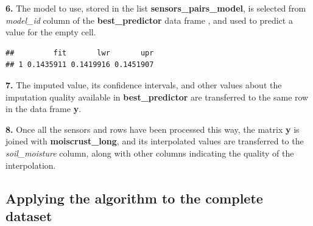 \documentclass[]{article}
\newenvironment{Shaded}{\begin{snugshade}}{\end{snugshade}}
\newcommand{\DataTypeTok}[1]{\textcolor[rgb]{0.13,0.29,0.53}{#1}}
\newcommand{\KeywordTok}[1]{\textcolor[rgb]{0.13,0.29,0.53}{\textbf{#1}}}
\newcommand{\NormalTok}[1]{#1}
\newcommand{\OperatorTok}[1]{\textcolor[rgb]{0.81,0.36,0.00}{\textbf{#1}}}
\newcommand{\OtherTok}[1]{\textcolor[rgb]{0.56,0.35,0.01}{#1}}
\newcommand{\StringTok}[1]{\textcolor[rgb]{0.31,0.60,0.02}{#1}}
\begin{document}
\begin{table}[H]
\centering
{}
\end{table}

\textbf{6.} The model to use, stored in the list
\textbf{sensors\_pairs\_model}, is selected from \emph{model\_id} column
of the \textbf{best\_predictor} data frame , and used to predict a value
for the empty cell.

\begin{Shaded}
\end{Shaded}

\begin{verbatim}
##         fit       lwr       upr
## 1 0.1435911 0.1419916 0.1451907
\end{verbatim}

\textbf{7.} The imputed value, its confidence intervals, and other
values about the imputation quality available in
\textbf{best\_predictor} are transferred to the same row in the data
frame \textbf{y}.

\textbf{8.} Once all the sensors and rows have been processed this way,
the matrix \textbf{y} is joined with \textbf{moiscrust\_long}, and its
interpolated values are transferred to the \emph{soil\_moisture} column,
along with other columns indicating the quality of the interpolation.

\hypertarget{applying-the-algorithm-to-the-complete-dataset}{%
\subsection{Applying the algorithm to the complete
dataset}\label{applying-the-algorithm-to-the-complete-dataset}}
\end{document}
